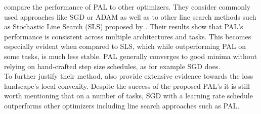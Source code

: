 \documentclass[a4paper]{scrartcl}
\begin{document}
\cite{mutschler2020parabolic} compare the performance of PAL to other optimizers. They consider commonly used approaches like SGD or ADAM as well as to other line search methods such as Stochastic Line Search (SLS) proposed by \cite{paquette2018stochastic}. Their results show that PAL's performance is consistent across multiple architectures and tasks. This becomes especially evident when compared to SLS, which while outperforming PAL on some tasks, is much less stable. PAL generally converges to good minima without relying on hand-crafted step size schedules, as for example SGD does.\\
To further justify their method, \cite{mutschler2020parabolic} also provide extensive evidence towards the loss landscape's local convexity. Despite the success of the proposed PAL's it is still worth mentioning that on a number of tasks, SGD with a learning rate schedule outperforms other optimizers including line search approaches such as PAL.
\end{document}
